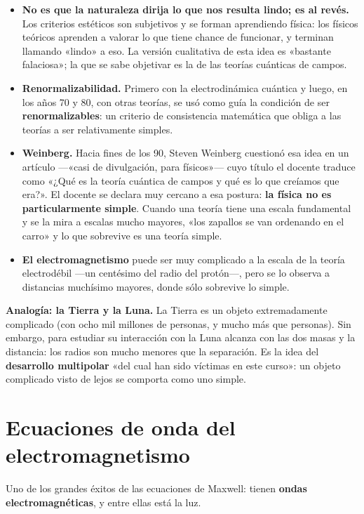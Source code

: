 \documentclass[12pt,a4paper]{article}
\begin{document}
\begin{itemize}
  \item \textbf{No es que la naturaleza dirija lo que nos resulta lindo; es al revés.} Los
  criterios estéticos son subjetivos y se forman aprendiendo física: los
  físicos teóricos aprenden a valorar lo que tiene chance de funcionar, y
  terminan llamando «lindo» a eso. La versión cualitativa de esta idea es
  «bastante falaciosa»; la que se sabe objetivar es la de las teorías
  cuánticas de campos.
  \item \textbf{Renormalizabilidad.} Primero con la electrodinámica cuántica y luego, en
  los años 70 y 80, con otras teorías, se usó como guía la condición de ser
  \textbf{renormalizables}: un criterio de consistencia matemática que obliga a las
  teorías a ser relativamente simples.
  \item \textbf{Weinberg.} Hacia fines de los 90, Steven Weinberg cuestionó esa idea en un
  artículo ---«casi de divulgación, para físicos»--- cuyo título el docente traduce
  como «¿Qué es la teoría cuántica de campos y qué es lo que creíamos que
  era?». El docente se declara muy cercano a esa postura: \textbf{la física no es
  particularmente simple}. Cuando una teoría tiene una escala fundamental y se
  la mira a escalas mucho mayores, «los zapallos se van ordenando en el carro»
  y lo que sobrevive es una teoría simple.
  \item \textbf{El electromagnetismo} puede ser muy complicado a la escala de la teoría
  electrodébil ---un centésimo del radio del protón---, pero se lo observa a
  distancias muchísimo mayores, donde sólo sobrevive lo simple.
\end{itemize}

\textbf{Analogía: la Tierra y la Luna.} La Tierra es un objeto extremadamente
complicado (con ocho mil millones de personas, y mucho más que personas). Sin
embargo, para estudiar su interacción con la Luna alcanza con las dos masas y la
distancia: los radios son mucho menores que la separación. Es la idea del
\textbf{desarrollo multipolar} «del cual han sido víctimas en este curso»: un objeto
complicado visto de lejos se comporta como uno simple.

\section{Ecuaciones de onda del electromagnetismo}

Uno de los grandes éxitos de las ecuaciones de Maxwell: tienen \textbf{ondas
electromagnéticas}, y entre ellas está la luz.
\end{document}
